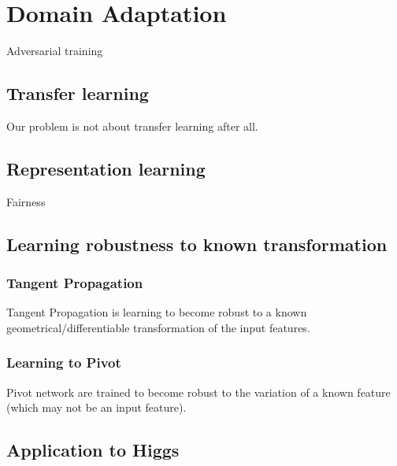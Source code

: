 
\chapter{Domain Adaptation}
\label{chap:domain_adaptation}
\ifpdf
    \graphicspath{{Chapter3/Figs/Raster/}{Chapter3/Figs/PDF/}{Chapter3/Figs/}}
\else
    \graphicspath{{Chapter3/Figs/Vector/}{Chapter3/Figs/}}
\fi


Adversarial training

\section{Transfer learning}

Our problem is not about transfer learning after all.

\section{Representation learning}

Fairness

\section{Learning robustness to known transformation}

\subsection{Tangent Propagation}

Tangent Propagation is learning to become robust to a known geometrical/differentiable transformation of the input features.

\subsection{Learning to Pivot}

Pivot network are trained to become robust to the variation of a known feature (which may not be an input feature).


\section{Application to Higgs}




